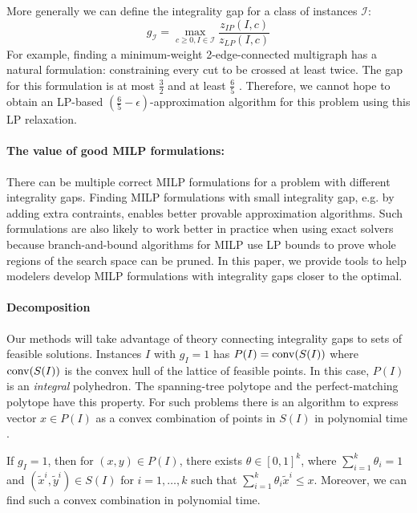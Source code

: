 More generally we can define the integrality gap for a class of instances $\mathcal{I}$:%
\begin{equation}
g_\mathcal{I} = \max_{c\geq 0 , I\in\mathcal{I}}\frac{z_{IP}(I,c)}{z_{LP}(I,c)}
\end{equation}
For example, finding a  minimum-weight 2-edge-connected multigraph has a natural formulation: constraining every cut to be crossed at least twice.  The gap for this formulation is at most $\frac{3}{2}$ \cite{Wolsey1980} and at least $\frac{6}{5}$ \cite{carr-ravi}. Therefore, we cannot hope to obtain an LP-based $(\frac{6}{5}-\epsilon)$-approximation algorithm for this problem using this LP relaxation.

\paragraph{The value of good MILP formulations:} There can be multiple correct MILP formulations for a problem with different integrality gaps. Finding MILP formulations with small integrality gap, e.g. by adding extra contraints, enables better provable approximation algorithms.  Such formulations are also likely to work better in practice when using exact solvers because branch-and-bound algorithms for MILP use LP bounds to prove whole regions of the search space can be pruned. In this paper, we provide tools to help modelers develop MILP formulations with integrality gaps closer to the optimal.

\paragraph{Decomposition} Our methods will take advantage of theory connecting integrality gaps to sets of feasible solutions. Instances $I$ with  $g_I=1$ has $P(I)=\operatorname{conv}(S(I))$ where $\operatorname{conv}(S(I))$ is the convex hull of the lattice of feasible points. In this case, $P(I)$ is an \textit{integral} polyhedron. The spanning-tree polytope and the perfect-matching polytope \cite{schrijver} have this property. For such problems there is an algorithm to express vector $x\in P(I)$ as a convex combination of points in $S(I)$ in polynomial time \cite{cons-cara}.
\begin{proposition}\label{cara}
	If $g_I=1$, then for $(x,y)\in P(I)$, there exists $\theta \in [0,1]^k$, where $\sum_{i=1}^{k}\theta_i =1$ and $(\tilde{x}^i,\tilde{y}^i)\in S(I)$ for $i=1,\ldots,k$ such that $\sum_{i=1}^{k}\theta_i \tilde{x}^i\leq x$. Moreover, we can find such a convex combination in polynomial time.
\end{proposition}

